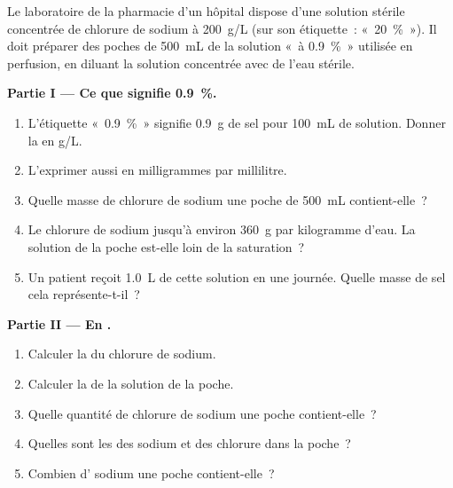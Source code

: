 \begin{problem}
\label{pb:g10:concentration-and-dilution:1}
Le laboratoire de la pharmacie d'un hôpital dispose d'une solution
stérile concentrée de chlorure de sodium à \qty{200}{g/L} (sur son
étiquette~: «~20~\%~»). Il doit préparer des poches de \qty{500}{mL} de
la solution «~à 0.9~\%~» utilisée en perfusion, en diluant la solution
concentrée avec de l'eau stérile.

\medskip
\noindent\textbf{Partie I --- Ce que signifie 0.9~\%.}
\begin{enumerate}
  \item L'étiquette «~0.9~\%~» signifie \qty{0.9}{g} de sel pour
        \qty{100}{mL} de solution. Donner la  en
        \si{g/L}.
  \item L'exprimer aussi en milligrammes par millilitre.
  \item Quelle masse de chlorure de sodium une poche de \qty{500}{mL}
        contient-elle~?
  \item Le chlorure de sodium  jusqu'à environ \qty{360}{g} par
        kilogramme d'eau. La solution de la poche est-elle loin de la
        saturation~?
  \item Un patient reçoit \qty{1.0}{L} de cette solution en une journée.
        Quelle masse de sel cela représente-t-il~?
\end{enumerate}

\medskip
\noindent\textbf{Partie II --- En .}
\begin{enumerate}[resume]
  \item Calculer la  du chlorure de sodium.
  \item Calculer la  de la solution de la poche.
  \item Quelle quantité de chlorure de sodium une poche contient-elle~?
  \item Quelles sont les  des  sodium et des
         chlorure dans la poche~?
  \item Combien d' sodium une poche contient-elle~?
\end{enumerate}


\end{problem}
